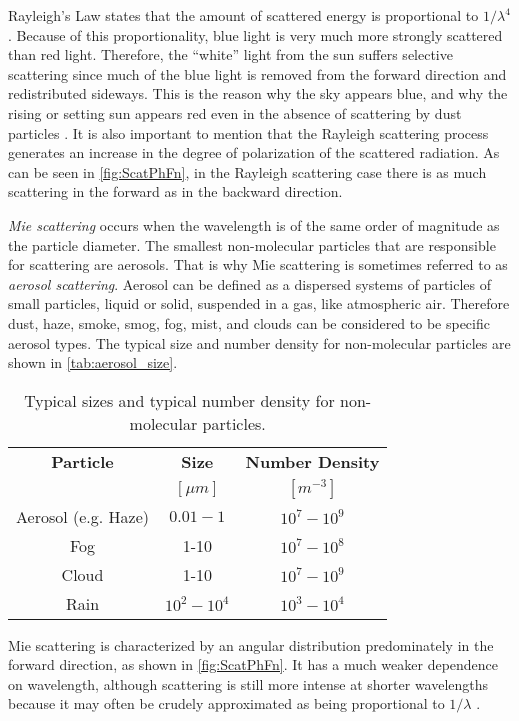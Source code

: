 Rayleigh's Law states that the amount of scattered energy is proportional to $1/\lambda^4$. Because of this proportionality, blue light is very much more strongly scattered than red light. Therefore, the ``white'' light from the sun suffers selective scattering since much of the blue light is removed from the forward direction and redistributed  sideways. This is the reason why the sky appears blue, and why the rising or setting sun appears red even in the absence of scattering by dust particles \citep{Rees1990}. It is also important to mention that the Rayleigh scattering process generates an increase in the degree of polarization of the scattered radiation. As can be seen in \autoref{fig:ScatPhFn}, in the Rayleigh scattering case there is as much scattering in the forward as in the backward direction. 

{\it Mie scattering} occurs when the wavelength is of the same order of magnitude as the particle diameter. The smallest non-molecular particles that are responsible for scattering are aerosols. That is why Mie scattering is sometimes referred to as {\it aerosol scattering}. Aerosol can be defined as a dispersed systems of particles of small particles, liquid or solid, suspended in a gas, like atmospheric air. Therefore dust, haze, smoke, smog, fog, mist, and clouds can be considered to be specific aerosol types. The typical size and number density for non-molecular particles are shown in \autoref{tab:aerosol_size}.

\begin{table}[htb]
\caption{ Typical sizes and typical number density for non-molecular particles. \label{tab:aerosol_size} } 
\centering
\begin{tabular}{c|c|c}
          \bfseries{Particle}   & \bfseries{Size}  & \bfseries{Number Density} \\ 
  & $[\mu m]$     & $[m^{-3}]$      \\ \hline \hline
    Aerosol (e.g. Haze) & $0.01-1$  &   $10^7-10^9$   \\
    Fog     & 1-10    & $10^7-10^8$   \\
    Cloud     & 1-10    & $10^7-10^9$   \\
    Rain    & $10^2-10^4$   & $10^3-10^4$   \\   
 \end{tabular}
\end{table}

Mie scattering is characterized by an angular distribution predominately in the forward direction, as shown in \autoref{fig:ScatPhFn}. It has a much weaker dependence on wavelength, although scattering is still more intense at shorter wavelengths because it may often be crudely approximated as being proportional to $1/\lambda$ \citep{Rees1990}.

